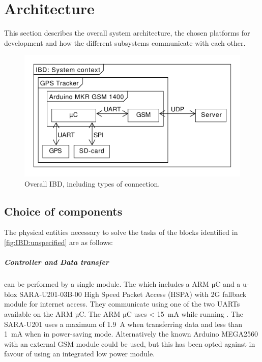 
\chapter{Architecture}
\label{sec:Architecture}
This section describes the overall system architecture, the chosen platforms for development and how the different subsystems communicate with each other.

\begin{figure}[H]
	\centering
	\includegraphics[width=0.7\linewidth]{gfx/Design/Overall_IBD.pdf}
	\caption{Overall IBD, including types of connection.}
	\label{fig:IBD:overall}
\end{figure}

\section{Choice of components}
The physical entities necessary to solve the tasks of the blocks identified in \cref{fig:IBD:unspecified} are as follows:

\paragraph{Controller and Data transfer} can be performed by a single module. The \MKR which includes a \SAMD ARM µC and a u-blox SARA-U201-03B-00 High Speed Packet Access (HSPA) with 2G fallback module for internet access\cite{MKRGSM1400}.
They communicate using one of the two UARTs available on the \SAMD ARM µC.
The \SAMD ARM µC uses \SI{< 15}{\milli\ampere} while running \cite[p.~791-794]{SAMD21}.
The SARA-U201 uses a maximum of \SI{1.9}{\ampere} when transferring data \cite[p.~26]{SARAU201} and less than \SI{1}{\milli\ampere} when in power-saving mode. Alternatively the known Arduino MEGA2560 with an external GSM module could be used, but this has been opted against in favour of using an integrated low power module.

